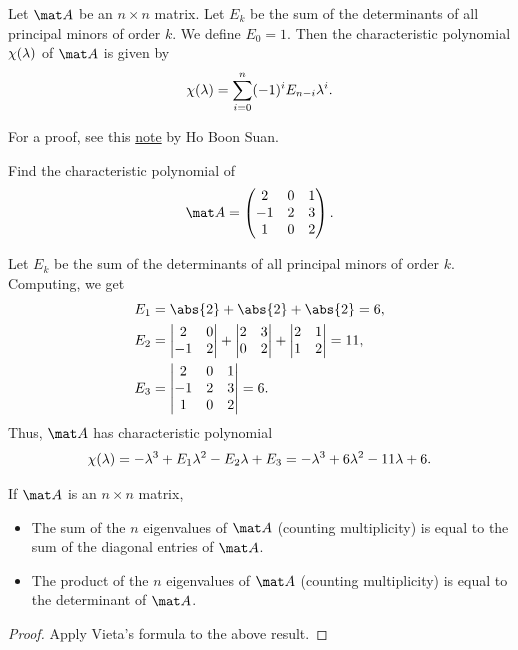 \begin{proposition}
    Let $\mat A$ be an $n \times n$ matrix. Let $E_k$ be the sum of the determinants of all principal minors of order $k$. We define $E_0 = 1$. Then the characteristic polynomial $\chi(\lambda)$ of $\mat A$ is given by \[\chi(\lambda) = \sum_{i = 0}^n (-1)^i E_{n-i} \lambda^i.\]
\end{proposition}

For a proof, see this \href{https://boonsuan.github.io/misc/cauchy_binet.pdf}{note} by Ho Boon Suan.

\begin{sample}
    Find the characteristic polynomial of \[\mat A = \begin{pmatrix}2 & 0 & 1 \\ -1 & 2 & 3 \\ 1 & 0 & 2\end{pmatrix}.\]
\end{sample}
\begin{sampans}
    Let $E_k$ be the sum of the determinants of all principal minors of order $k$. Computing, we get
    \begin{align*}
        E_1 &= \abs{2} + \abs{2} + \abs{2} = 6,\\
        E_2 &= \begin{vmatrix}2 & 0 \\ -1 & 2\end{vmatrix} + \begin{vmatrix}2 & 3 \\ 0 & 2\end{vmatrix} + \begin{vmatrix}2 & 1 \\ 1 & 2\end{vmatrix} = 11,\\
        E_3 &= \begin{vmatrix}2 & 0 & 1 \\ -1 & 2 & 3 \\ 1 & 0 & 2\end{vmatrix} = 6.
    \end{align*}
    Thus, $\mat A$ has characteristic polynomial \[\chi(\lambda) = -\lambda^3 + E_1 \lambda^2 - E_2 \lambda + E_3 = -\lambda^3 + 6 \lambda^2 - 11 \lambda + 6.\]
\end{sampans}

\begin{corollary}
    If $\mat A$ is an $n \times n$ matrix,
    \begin{itemize}
        \item The sum of the $n$ eigenvalues of $\mat A$ (counting multiplicity) is equal to the sum of the diagonal entries of $\mat A$.
        \item The product of the $n$ eigenvalues of $\mat A$ (counting multiplicity) is equal to the determinant of $\mat A$.
    \end{itemize}
\end{corollary}
\begin{proof}
    Apply Vieta's formula to the above result.
\end{proof}


